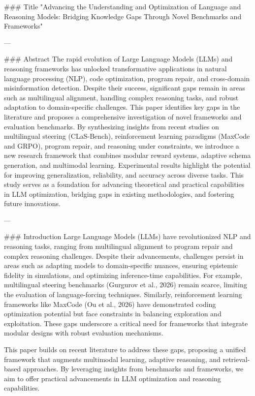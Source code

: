 ### Title  
"Advancing the Understanding and Optimization of Language and Reasoning Models: Bridging Knowledge Gaps Through Novel Benchmarks and Frameworks"

---

### Abstract  
The rapid evolution of Large Language Models (LLMs) and reasoning frameworks has unlocked transformative applications in natural language processing (NLP), code optimization, program repair, and cross-domain misinformation detection. Despite their success, significant gaps remain in areas such as multilingual alignment, handling complex reasoning tasks, and robust adaptation to domain-specific challenges. This paper identifies key gaps in the literature and proposes a comprehensive investigation of novel frameworks and evaluation benchmarks. By synthesizing insights from recent studies on multilingual steering (CLaS-Bench), reinforcement learning paradigms (MaxCode and GRPO), program repair, and reasoning under constraints, we introduce a new research framework that combines modular reward systems, adaptive schema generation, and multimodal learning. Experimental results highlight the potential for improving generalization, reliability, and accuracy across diverse tasks. This study serves as a foundation for advancing theoretical and practical capabilities in LLM optimization, bridging gaps in existing methodologies, and fostering future innovations.

---

### Introduction  
Large Language Models (LLMs) have revolutionized NLP and reasoning tasks, ranging from multilingual alignment to program repair and complex reasoning challenges. Despite their advancements, challenges persist in areas such as adapting models to domain-specific nuances, ensuring epistemic fidelity in simulations, and optimizing inference-time capabilities. For example, multilingual steering benchmarks (Gurgurov et al., 2026) remain scarce, limiting the evaluation of language-forcing techniques. Similarly, reinforcement learning frameworks like MaxCode (Ou et al., 2026) have demonstrated coding optimization potential but face constraints in balancing exploration and exploitation. These gaps underscore a critical need for frameworks that integrate modular designs with robust evaluation mechanisms.  

This paper builds on recent literature to address these gaps, proposing a unified framework that augments multimodal learning, adaptive reasoning, and retrieval-based approaches. By leveraging insights from benchmarks and frameworks, we aim to offer practical advancements in LLM optimization and reasoning capabilities.

